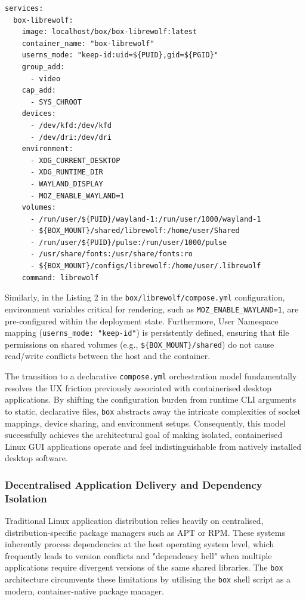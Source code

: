 \documentclass[journal,onecolumn]{IEEEtran}
\newcommand{\code}[1]{\texttt{#1}}
\begin{document}
\begin{lstlisting}[caption={Declarative host integration within the \code{box} Librewolf compose configuration}, label={lst:librewolf_compose}]
services:
  box-librewolf:
    image: localhost/box/box-librewolf:latest
    container_name: "box-librewolf"
    userns_mode: "keep-id:uid=${PUID},gid=${PGID}"
    group_add:
      - video
    cap_add:
      - SYS_CHROOT
    devices:
      - /dev/kfd:/dev/kfd
      - /dev/dri:/dev/dri
    environment:
      - XDG_CURRENT_DESKTOP
      - XDG_RUNTIME_DIR
      - WAYLAND_DISPLAY
      - MOZ_ENABLE_WAYLAND=1
    volumes:
      - /run/user/${PUID}/wayland-1:/run/user/1000/wayland-1
      - ${BOX_MOUNT}/shared/librewolf:/home/user/Shared
      - /run/user/${PUID}/pulse:/run/user/1000/pulse
      - /usr/share/fonts:/usr/share/fonts:ro
      - ${BOX_MOUNT}/configs/librewolf:/home/user/.librewolf
    command: librewolf
\end{lstlisting}

Similarly, in the Listing 2 in the \code{box/librewolf/compose.yml} configuration, environment variables critical for rendering, such as \code{MOZ\_ENABLE\_WAYLAND=1}, are pre-configured within the deployment state. Furthermore, User Namespace mapping (\code{userns\_mode: "keep-id"}) is persistently defined, ensuring that file permissions on shared volumes (e.g., \code{\$\{BOX\_MOUNT\}/shared}) do not cause read/write conflicts between the host and the container.

The transition to a declarative \code{compose.yml} orchestration model fundamentally resolves the UX friction previously associated with containerised desktop applications. By shifting the configuration burden from runtime CLI arguments to static, declarative files, \code{box} abstracts away the intricate complexities of socket mappings, device sharing, and environment setups. Consequently, this model successfully achieves the architectural goal of making isolated, containerised Linux GUI applications operate and feel indistinguishable from natively installed desktop software.



\subsubsection{Decentralised Application Delivery and Dependency Isolation}

Traditional Linux application distribution relies heavily on centralised, distribution-specific package managers such as APT or RPM. These systems inherently process dependencies at the host operating system level, which frequently leads to version conflicts and "dependency hell" when multiple applications require divergent versions of the same shared libraries. The \code{box} architecture circumvents these limitations by utilising the \code{box} shell script as a modern, container-native package manager. 
\end{document}
